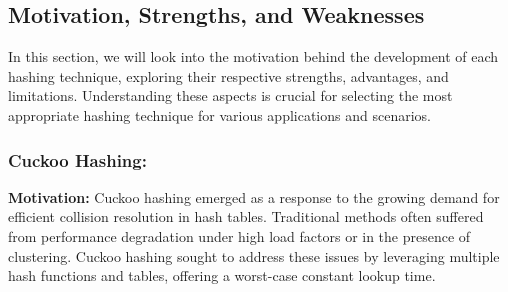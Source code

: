 \documentclass[12pt]{article}
\begin{document}
\newpage

\subsection{Motivation, Strengths, and Weaknesses}


In this section, we will look into the motivation behind the development of each hashing technique, exploring their respective strengths, advantages, and limitations. Understanding these aspects is crucial for selecting the most appropriate hashing technique for various applications and scenarios.

\subsubsection{Cuckoo Hashing:}
\textbf{Motivation:} Cuckoo hashing emerged as a response to the growing demand for efficient collision resolution in hash tables. Traditional methods often suffered from performance degradation under high load factors or in the presence of clustering. Cuckoo hashing sought to address these issues by leveraging multiple hash functions and tables, offering a worst-case constant lookup time.
\end{document}
